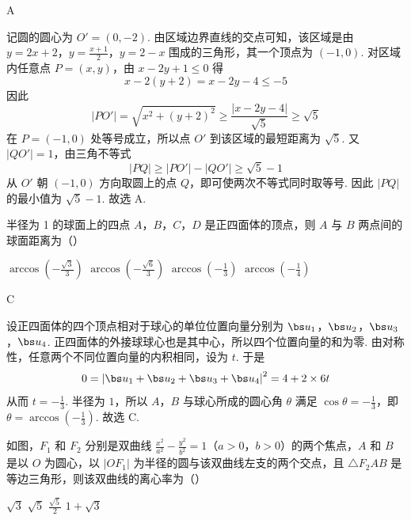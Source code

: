 \begin{answer}
A
\end{answer}

\begin{solution}
记圆的圆心为 \(O'=(0,-2)\). 由区域边界直线的交点可知，该区域是由
\(y=2x+2\)，\(y=\frac{x+1}{2}\)，\(y=2-x\)
围成的三角形，其一个顶点为 \((-1,0)\). 对区域内任意点 \(P=(x,y)\)，由 \(x-2y+1\leqslant0\) 得
\[
x-2(y+2)=x-2y-4\leqslant-5
\]
因此
\[
|PO'|=\sqrt{x^2+(y+2)^2}\geqslant\frac{|x-2y-4|}{\sqrt{5}}\geqslant\sqrt{5}
\]
在 \(P=(-1,0)\) 处等号成立，所以点 \(O'\) 到该区域的最短距离为 \(\sqrt{5}\). 又 \(|QO'|=1\)，由三角不等式
\[
|PQ|\geqslant|PO'|-|QO'|\geqslant\sqrt{5}-1
\]
从 \(O'\) 朝 \((-1,0)\) 方向取圆上的点 \(Q\)，即可使两次不等式同时取等号. 因此 \(|PQ|\) 的最小值为 \(\sqrt{5}-1\). 故选 A.
\end{solution}

\begin{problem}
半径为 1 的球面上的四点 \(A\)，\(B\)，\(C\)，\(D\) 是正四面体的顶点，则 \(A\) 与 \(B\) 两点间的球面距离为（\quad）

\choices
    {\(\arccos \left(-\frac{\sqrt{3}}{3}\right)\)}
    {\(\arccos \left(-\frac{\sqrt{6}}{3}\right)\)}
    {\(\arccos \left(-\frac{1}{3}\right)\)}
    {\(\arccos \left(-\frac{1}{4}\right)\)}
\end{problem}

\begin{answer}
C
\end{answer}

\begin{solution}
设正四面体的四个顶点相对于球心的单位位置向量分别为 \(\bs u_1\)，\(\bs u_2\)，\(\bs u_3\)，\(\bs u_4\). 正四面体的外接球球心也是其中心，所以四个位置向量的和为零. 由对称性，任意两个不同位置向量的内积相同，设为 \(t\). 于是
\[
0=\left|\bs u_1+\bs u_2+\bs u_3+\bs u_4\right|^2=4+2\times6t
\]
从而 \(t=-\frac13\). 半径为 \(1\)，所以 \(A\)，\(B\) 与球心所成的圆心角 \(\theta\) 满足 \(\cos\theta=-\frac13\)，即 \(\theta=\arccos\left(-\frac13\right)\). 故选 C.
\end{solution}

\begin{problem}
如图，\(F_{1}\) 和 \(F_{2}\) 分别是双曲线 \( \frac{x^{2}}{a^{2}} - \frac{y^{2}}{b^{2}} = 1 \)（\(a > 0\)，\(b > 0\)）的两个焦点，\(A\) 和 \(B\) 是以 \(O\) 为圆心，以 \( |OF_{1}| \) 为半径的圆与该双曲线左支的两个交点，且 \( \triangle F_{2}AB \) 是等边三角形，则该双曲线的离心率为（\quad）



\choices
    {\(\sqrt{3}\)}
    {\(\sqrt{5}\)}
    {\( \frac{\sqrt{5}}{2} \)}
    {\(1 + \sqrt{3}\)}
\end{problem}


